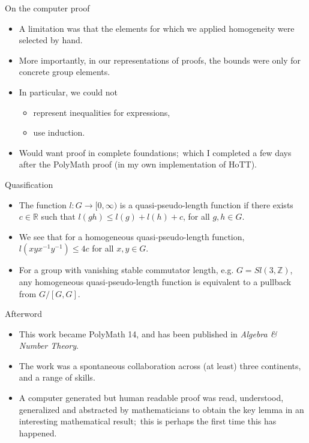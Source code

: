 \documentclass[aspectratio=1610,17pt, ucs]{beamer}
\begin{document}
\begin{frame}{On the computer proof}
  \begin{itemize}
    \item A limitation was that the elements for which we applied homogeneity were selected by hand.
    \item \pause More importantly, in our representations of proofs, the bounds were only for concrete group elements.
    \item\pause In particular, we could not 
    \begin{itemize}
      \item\pause represent inequalities for expressions,
      \item\pause use induction.
    \end{itemize}
    \item\pause Would want proof in complete foundations;\pause\ which I completed a few days after the PolyMath proof (in my own implementation of HoTT).
  \end{itemize}
\end{frame}

\begin{frame}{Quasification}
  \begin{itemize}[<+->]
    \item The function $l: G \to [0, \infty)$ is a \alert{quasi-pseudo-length function}  if there exists $c \in \mathbb{R}$ such that
    $l(gh) \leq l(g) + l(h) + c$, for all $g,h\in G$.
    \item We see that for a homogeneous quasi-pseudo-length function, $l(xyx^{-1}y^{-1}) \leq 4c$ for all $x, y\in G$.
    \item For a group with vanishing \alert{stable commutator length}, e.g. $G=Sl(3 , \mathbb{Z})$, any homogeneous
    quasi-pseudo-length function is equivalent to a pullback from $G/[G, G]$. 
  \end{itemize}
  
\end{frame}

\begin{frame}{Afterword}
  \begin{itemize}
    \item This work became \alert{PolyMath 14}, and has been published in \emph{Algebra \& Number Theory}.
    \item\pause The work was a spontaneous collaboration across (at least) three continents, and a range of skills.
    \item\pause A \alert{computer generated} but \alert{human readable} proof was read, understood, generalized and abstracted by mathematicians to obtain the key lemma in an interesting mathematical result;\pause\  this is perhaps the first time this has happened.
  \end{itemize}
\end{frame}



\end{document}
